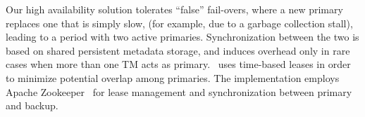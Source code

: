 
Our high availability solution tolerates ``false'' fail-overs, where a new primary replaces one that is simply slow,
(for example, due to a garbage collection stall), leading to a period with two active primaries.
Synchronization between the two  is based on  shared persistent metadata storage, 
and induces overhead only in rare cases when more than one TM acts as primary.
\sys\ uses time-based leases in order to minimize potential overlap among primaries. 
The implementation employs Apache Zookeeper~\cite{zookeeper}
for lease management and synchronization between primary and backup. 
